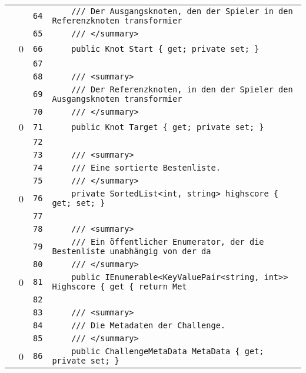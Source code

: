 \documentclass[a4paper,10pt]{article}
\begin{document}
\begin{longtable}[l]{lrrl}
\cellcolor{gray} &  & \verb~64~ & \verb~    /// Der Ausgangsknoten, den der Spieler in den Referenzknoten transformier~\\
\cellcolor{gray} &  & \verb~65~ & \verb~    /// </summary>~\\
\cellcolor{red} & 0 & \verb~66~ & \verb~    public Knot Start { get; private set; }~\\
\cellcolor{gray} &  & \verb~67~ & \verb~~\\
\cellcolor{gray} &  & \verb~68~ & \verb~    /// <summary>~\\
\cellcolor{gray} &  & \verb~69~ & \verb~    /// Der Referenzknoten, in den der Spieler den Ausgangsknoten transformier~\\
\cellcolor{gray} &  & \verb~70~ & \verb~    /// </summary>~\\
\cellcolor{red} & 0 & \verb~71~ & \verb~    public Knot Target { get; private set; }~\\
\cellcolor{gray} &  & \verb~72~ & \verb~~\\
\cellcolor{gray} &  & \verb~73~ & \verb~    /// <summary>~\\
\cellcolor{gray} &  & \verb~74~ & \verb~    /// Eine sortierte Bestenliste.~\\
\cellcolor{gray} &  & \verb~75~ & \verb~    /// </summary>~\\
\cellcolor{red} & 0 & \verb~76~ & \verb~    private SortedList<int, string> highscore { get; set; }~\\
\cellcolor{gray} &  & \verb~77~ & \verb~~\\
\cellcolor{gray} &  & \verb~78~ & \verb~    /// <summary>~\\
\cellcolor{gray} &  & \verb~79~ & \verb~    /// Ein öffentlicher Enumerator, der die Bestenliste unabhängig von der da~\\
\cellcolor{gray} &  & \verb~80~ & \verb~    /// </summary>~\\
\cellcolor{red} & 0 & \verb~81~ & \verb~    public IEnumerable<KeyValuePair<string, int>> Highscore { get { return Met~\\
\cellcolor{gray} &  & \verb~82~ & \verb~~\\
\cellcolor{gray} &  & \verb~83~ & \verb~    /// <summary>~\\
\cellcolor{gray} &  & \verb~84~ & \verb~    /// Die Metadaten der Challenge.~\\
\cellcolor{gray} &  & \verb~85~ & \verb~    /// </summary>~\\
\cellcolor{red} & 0 & \verb~86~ & \verb~    public ChallengeMetaData MetaData { get; private set; }~\\

\end{longtable}
\end{document}
